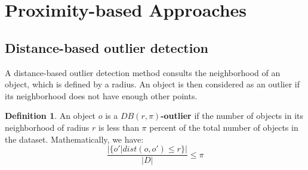 \documentclass[12pt, openany]{report}
\theoremstyle{definition}
\newtheorem{definition}[thm]{Definition}
\begin{document}
\section{Proximity-based Approaches}
\subsection{Distance-based outlier detection}
A distance-based outlier detection method consults the neighborhood of an object, which is defined by a radius. An object is then considered as an outlier if its neighborhood does not have enough other points.
\begin{definition}
    An object $o$ is a \textbf{$DB(r,\pi)$-outlier} if the number of objects in its neighborhood of radius $r$ is less than $\pi$ percent of the total number of objects in the dataset. Mathematically, we have: 
    \begin{equation}
        \frac{|\{o' | dist(o, o') \leq r\}|}{|D|} \leq \pi
    \end{equation}
\end{definition}
\end{document}
